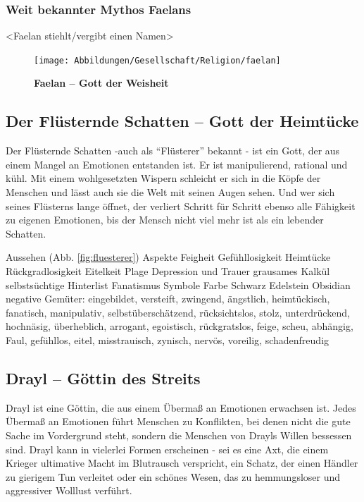\subsubsection{Weit bekannter Mythos Faelans}
<Faelan stiehlt/vergibt einen Namen> 

\begin{figure}[tbh]
	\centering
	\texttt{[image: Abbildungen/Gesellschaft/Religion/faelan]}
	\caption[Faelan -- Gott der Weisheit]{\textbf{Faelan -- Gott der Weisheit}}
	\label{fig:faelan}
\end{figure}




\subsection{Der Flüsternde Schatten -- Gott der Heimtücke}
Der Flüsternde Schatten -auch als ``Flüsterer'' bekannt - ist ein Gott, der aus einem Mangel an Emotionen entstanden ist.
Er ist manipulierend, rational und kühl. 
Mit einem wohlgesetzten Wispern schleicht er sich in die Köpfe der Menschen und lässt auch sie die Welt mit seinen Augen sehen. 
Und wer sich seines Flüsterns lange öffnet, der verliert Schritt für Schritt ebenso alle Fähigkeit zu eigenen Emotionen, bis der Mensch nicht viel mehr ist als ein lebender Schatten.
\begin{outline}
	\1 Aussehen (Abb. \ref{fig:fluesterer})
	\1 Aspekte
		\2 Feigheit
		\2 Gefühllosigkeit
		\2 Heimtücke
		\2 Rückgradlosigkeit
		\2 Eitelkeit
	\1 Plage
		\2 Depression und Trauer
		\2 grausames Kalkül
		\2 selbstsüchtige Hinterlist
		\2 Fanatismus
	\1 Symbole
		\2 Farbe Schwarz
		\2 Edelstein Obsidian
	\1 negative Gemüter: eingebildet, versteift, zwingend, ängstlich, heimtückisch, fanatisch, manipulativ, selbstüberschätzend, rücksichtslos, stolz, unterdrückend, hochnäsig,
	überheblich, arrogant, egoistisch, rückgratslos, feige, scheu, abhängig, Faul, gefühllos, eitel, misstrauisch, zynisch, nervös, voreilig, schadenfreudig
\end{outline}




\subsection{Drayl -- Göttin des Streits}
Drayl ist eine Göttin, die aus einem Übermaß an Emotionen erwachsen ist. 
Jedes Übermaß an Emotionen führt Menschen zu Konflikten, bei denen nicht die gute Sache im Vordergrund steht, sondern die Menschen von Drayls Willen bessessen sind.
Drayl kann in vielerlei Formen erscheinen - sei es eine Axt, die einem Krieger ultimative Macht im Blutrausch verspricht, ein Schatz, der einen Händler zu gierigem Tun verleitet oder ein schönes Wesen, das zu hemmungsloser und aggressiver Wolllust verführt.

